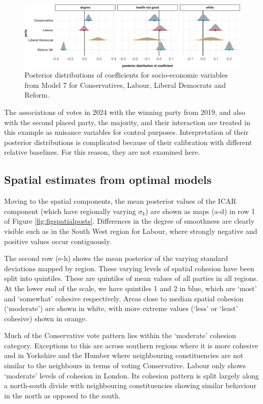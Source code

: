 \documentclass[webpdf,large,contemporary,namedate]{oup-authoring-template}
\theoremstyle{thmstyleone}
\theoremstyle{thmstyletwo}
\theoremstyle{thmstylethree}
\begin{document}
\begin{figure}[th]

{\centering \includegraphics[width=0.85\linewidth]{jrss_resubmission3_files/figure-latex/figsocecposts-1} 

}

\caption{Posterior distributions of coefficients for socio-economic variables from Model 7 for Conservatives, Labour, Liberal Democrats and Reform.}\label{fig:figsocecposts}
\end{figure}

The associations of votes in 2024 with the winning party from 2019, and
also with the second placed party, the majority, and their interaction
are treated in this example as nuisance variables for control purposes.
Interpretation of their posterior distributions is complicated because
of their calibration with different relative baselines. For this reason,
they are not examined here.

\subsection{Spatial estimates from optimal
models}\label{spatial-estimates-from-optimal-models}

Moving to the spatial components, the mean posterior values of the ICAR
component (which have regionally varying \(\sigma_k\)) are shown as maps
(a-d) in row 1 of Figure \ref{fig:figspatialposts}. Differences in the
degree of smoothness are clearly visible such as in the South West
region for Labour, where strongly negative and positive values occur
contiguously.

The second row (e-h) shows the mean posterior of the varying standard
deviations mapped by region. These varying levels of spatial cohesion
have been split into quintiles. These are quintiles of mean values of
all parties in all regions. At the lower end of the scale, we have
quintiles 1 and 2 in blue, which are `most' and `somewhat' cohesive
respectively. Areas close to median spatial cohesion (`moderate') are
shown in white, with more extreme values (`less' or `least' cohesive)
shown in orange.

Much of the Conservative vote pattern lies within the `moderate'
cohesion category. Exceptions to this are across southern regions where
it is more cohesive and in Yorkshire and the Humber where neighbouring
constituencies are not similar to the neighbours in terms of voting
Conservative. Labour only shows `moderate' levels of cohesion in London.
Its cohesion pattern is split largely along a north-south divide with
neighbouring constituencies showing similar behaviour in the north as
opposed to the south.
\end{document}
